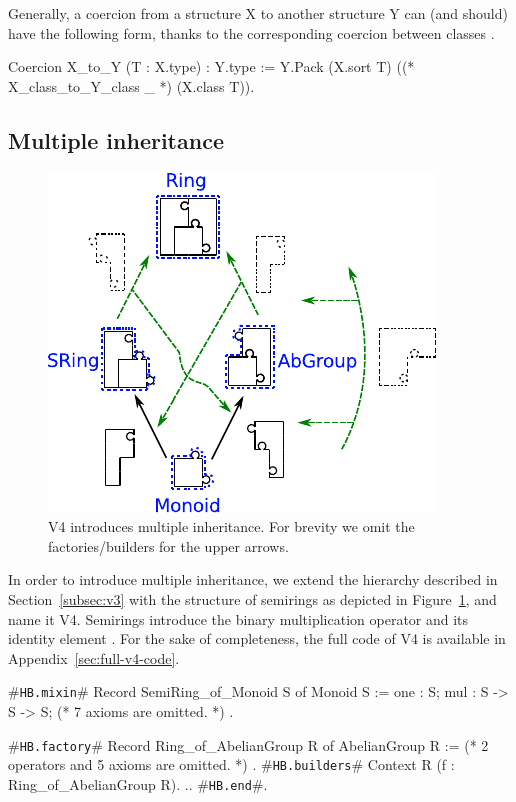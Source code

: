 \documentclass[a4paper,UKenglish,cleveref, autoref]{lipics-v2019}
\newcommand{\hbmixin}{{\tt\color{dkgreen}HB.mixin}}
\newcommand{\hbfactory}{{\tt\color{dkgreen}HB.factory}}
\newcommand{\hbbuilders}{{\tt\color{dkgreen}HB.builders}}
\newcommand{\hbend}{{\tt\color{dkgreen}HB.end}}
\theoremstyle{implem}
\theoremstyle{implem}
\theoremstyle{command}
\theoremstyle{commands}
\begin{document}
Generally, a coercion from a structure X to another structure Y can (and should) have the following form, thanks to the corresponding coercion between classes .
\begin{coqcode}
Coercion X_to_Y (T : X.type) : Y.type :=
  Y.Pack (X.sort T) ((* X_class_to_Y_class _ *) (X.class T)).
\end{coqcode}

\subsection{Multiple inheritance}

\begin{figure}
 \includegraphics[width=.4\textwidth]{v4.pdf}
 \caption{V4 introduces multiple inheritance. For brevity we omit the factories/builders for the upper arrows.}
 \label{fig:puzzle_v4}
\end{figure}
In order to introduce multiple inheritance, we extend the hierarchy described in
Section~\ref{subsec:v3} with the structure of semirings %
as depicted in Figure~\ref{fig:puzzle_v4}, and name it V4. Semirings introduce the
binary multiplication operator  and its identity element
.  For the sake of completeness, the full code of V4 is available in
Appendix~\ref{sec:full-v4-code}.

\begin{coqcode}
#\hbmixin{}# Record SemiRing_of_Monoid S
  of Monoid S := {
  one : S;
  mul : S -> S -> S;
  (* 7 axioms are omitted. *)
}.

#\hbfactory{}# Record Ring_of_AbelianGroup R
  of AbelianGroup R := {
  (* 2 operators and 5 axioms are omitted. *)
}.
#\hbbuilders{}# Context R (f : Ring_of_AbelianGroup R).
..
#\hbend{}#.
\end{coqcode}
\end{document}
